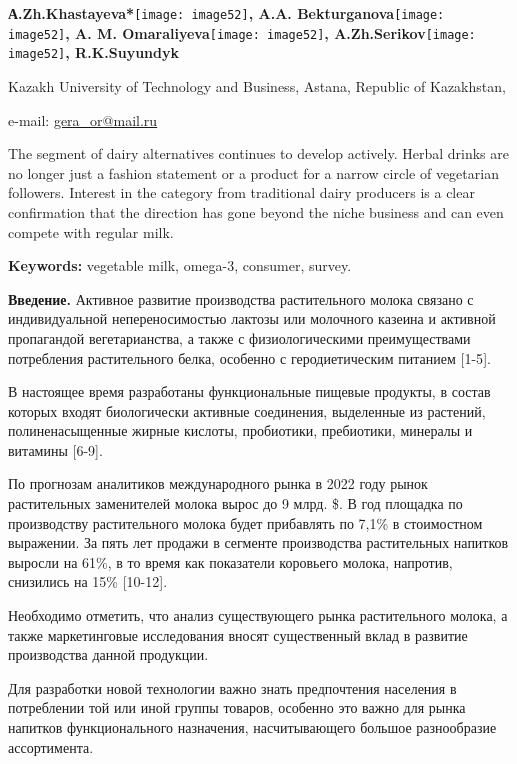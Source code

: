 {\bfseries А.Zh.Khastayeva*}\texttt{[image: image52]}{\bfseries ,
A.A.
Bekturganova}\texttt{[image: image52]}{\bfseries ,
A. M.
Omaraliyeva}\texttt{[image: image52]}{\bfseries ,
A.Zh.Serikov}\texttt{[image: image52]}{\bfseries ,
R.K.Suyundyk}

Kazakh University of Technology and Business, Astana, Republic of
Kazakhstan,

e-mail: \href{mailto:gera_or@mail.ru}{\ul{gera\_or@mail.ru}}

The segment of dairy alternatives continues to develop actively. Herbal
drinks are no longer just a fashion statement or a product for a narrow
circle of vegetarian followers. Interest in the category from
traditional dairy producers is a clear confirmation that the direction
has gone beyond the niche business and can even compete with regular
milk.

{\bfseries Keywords:} vegetable milk, omega-3, consumer, survey.

{\bfseries Введение.} Активное развитие производства растительного молока
связано с индивидуальной непереносимостью лактозы или молочного казеина
и активной пропагандой вегетарианства, а также с физиологическими
преимуществами потребления растительного белка, особенно с
геродиетическим питанием {[}1-5{]}.

В настоящее время разработаны функциональные пищевые продукты, в состав
которых входят биологически активные соединения, выделенные из растений,
полиненасыщенные жирные кислоты, пробиотики, пребиотики, минералы и
витамины {[}6-9{]}.

По прогнозам аналитиков международного рынка в 2022 году рынок
растительных заменителей молока вырос до 9 млрд. \$. В год площадка по
производству растительного молока будет прибавлять по 7,1\% в
стоимостном выражении. За пять лет продажи в сегменте производства
растительных напитков выросли на 61\%, в то время как показатели
коровьего молока, напротив, снизились на 15\% {[}10-12{]}.

Необходимо отметить, что анализ существующего рынка растительного
молока, а также маркетинговые исследования вносят существенный вклад в
развитие производства данной продукции.

Для разработки новой технологии важно знать предпочтения населения в
потреблении той или иной группы товаров, особенно это важно для рынка
напитков функционального назначения, насчитывающего большое разнообразие
ассортимента.

